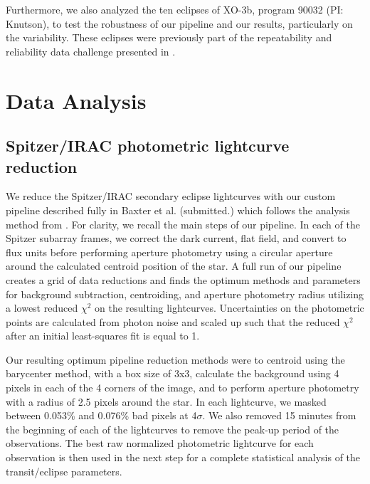 Furthermore, we also analyzed the ten eclipses of XO-3b, program 90032 (PI: Knutson), to test the robustness of our pipeline and our results, particularly on the variability. These eclipses were previously part of the repeatability and reliability data challenge presented in \citet{Ingalls2016}.

\section{Data Analysis}

\subsection{Spitzer/IRAC photometric lightcurve reduction}

We reduce the Spitzer/IRAC secondary eclipse lightcurves with our custom pipeline described fully in Baxter et al. (submitted.) which follows the analysis method from \citep{Deming2015}. For clarity, we recall the main steps of our pipeline. In each of the Spitzer subarray frames, we correct the dark current, flat field, and convert to flux units before performing aperture photometry using a circular aperture around the calculated centroid position of the star. %
A full run of our pipeline creates a grid of data reductions and finds the optimum methods and parameters for background subtraction, centroiding, and aperture photometry radius utilizing a lowest reduced $\chi^2$ on the resulting lightcurves. Uncertainties on the photometric points are calculated from photon noise and scaled up such that the reduced $\chi^2$ after an initial least-squares fit is equal to 1.

Our resulting optimum pipeline reduction methods were to centroid using the barycenter method, with a box size of 3x3, calculate the background using 4 pixels in each of the 4 corners of the image, and to perform aperture photometry with a radius of 2.5 pixels around the star. In each lightcurve, we masked between 0.053\% and 0.076\% bad pixels at 4$\sigma$. We also removed 15 minutes from the beginning of each of the lightcurves to remove the peak-up period of the observations. The best raw normalized photometric lightcurve for each observation is then used in the next step for a complete statistical analysis of the transit/eclipse parameters.

